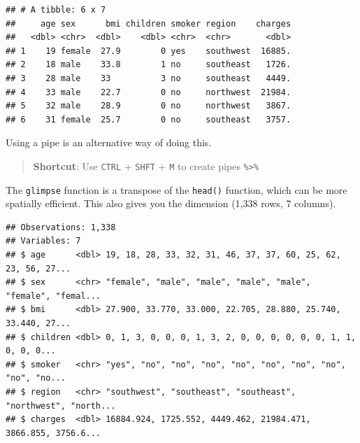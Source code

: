 \documentclass[
  openany]{book}
\newenvironment{Shaded}{\begin{snugshade}}{\end{snugshade}}
\newcommand{\KeywordTok}[1]{\textcolor[rgb]{0.13,0.29,0.53}{\textbf{#1}}}
\newcommand{\NormalTok}[1]{#1}
\newcommand{\OperatorTok}[1]{\textcolor[rgb]{0.81,0.36,0.00}{\textbf{#1}}}
\newcommand{\StringTok}[1]{\textcolor[rgb]{0.31,0.60,0.02}{#1}}
\begin{document}
\begin{verbatim}
## # A tibble: 6 x 7
##     age sex      bmi children smoker region    charges
##   <dbl> <chr>  <dbl>    <dbl> <chr>  <chr>       <dbl>
## 1    19 female  27.9        0 yes    southwest  16885.
## 2    18 male    33.8        1 no     southeast   1726.
## 3    28 male    33          3 no     southeast   4449.
## 4    33 male    22.7        0 no     northwest  21984.
## 5    32 male    28.9        0 no     northwest   3867.
## 6    31 female  25.7        0 no     southeast   3757.
\end{verbatim}

Using a pipe is an alternative way of doing this.

\begin{Shaded}
\end{Shaded}

\begin{quote}
\textbf{Shortcut}: Use \texttt{CTRL} + \texttt{SHFT} + \texttt{M} to create pipes \texttt{\%\textgreater{}\%}
\end{quote}

The \texttt{glimpse} function is a transpose of the \texttt{head()} function, which can be more spatially efficient. This also gives you the dimension (1,338 rows, 7 columns).

\begin{Shaded}
\end{Shaded}

\begin{verbatim}
## Observations: 1,338
## Variables: 7
## $ age      <dbl> 19, 18, 28, 33, 32, 31, 46, 37, 37, 60, 25, 62, 23, 56, 27...
## $ sex      <chr> "female", "male", "male", "male", "male", "female", "femal...
## $ bmi      <dbl> 27.900, 33.770, 33.000, 22.705, 28.880, 25.740, 33.440, 27...
## $ children <dbl> 0, 1, 3, 0, 0, 0, 1, 3, 2, 0, 0, 0, 0, 0, 0, 1, 1, 0, 0, 0...
## $ smoker   <chr> "yes", "no", "no", "no", "no", "no", "no", "no", "no", "no...
## $ region   <chr> "southwest", "southeast", "southeast", "northwest", "north...
## $ charges  <dbl> 16884.924, 1725.552, 4449.462, 21984.471, 3866.855, 3756.6...
\end{verbatim}
\end{document}
